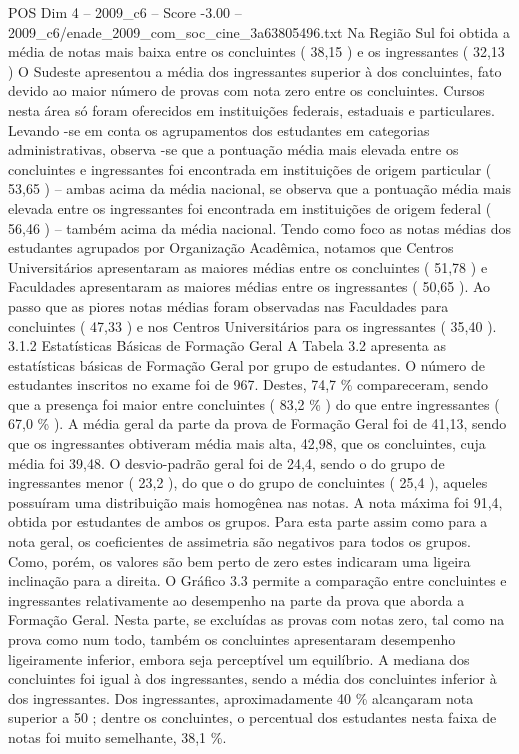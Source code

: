 \begin{textsample}{POS Dim 4 – 2009\_c6 – Score -3.00 – 2009\_c6/enade\_2009\_com\_soc\_cine\_3a63805496.txt}
Na Região Sul foi obtida a média de notas mais baixa entre os concluintes ( 38,15 ) e os ingressantes ( 32,13 ) O Sudeste apresentou a média dos ingressantes superior à dos concluintes, fato devido ao maior número de provas com nota zero entre os concluintes.
Cursos nesta área só foram oferecidos em instituições federais, estaduais e particulares.
Levando -se em conta os agrupamentos dos estudantes em categorias administrativas, observa -se que a pontuação média mais elevada entre os concluintes e ingressantes foi encontrada em instituições de origem particular ( 53,65 ) – ambas acima da média nacional, se observa que a pontuação média mais elevada entre os ingressantes foi encontrada em instituições de origem federal ( 56,46 ) – também acima da média nacional.
Tendo como foco as notas médias dos estudantes agrupados por Organização Acadêmica, notamos que Centros Universitários apresentaram as maiores médias entre os concluintes ( 51,78 ) e Faculdades apresentaram as maiores médias entre os ingressantes ( 50,65 ).
Ao passo que as piores notas médias foram observadas nas Faculdades para concluintes ( 47,33 ) e nos Centros Universitários para os ingressantes ( 35,40 ). 3.1.2 Estatísticas Básicas de Formação Geral A Tabela 3.2 apresenta as estatísticas básicas de Formação Geral por grupo de estudantes.
O número de estudantes inscritos no exame foi de 967.
Destes, 74,7 \% compareceram, sendo que a presença foi maior entre concluintes ( 83,2 \% ) do que entre ingressantes ( 67,0 \% ).
A média geral da parte da prova de Formação Geral foi de 41,13, sendo que os ingressantes obtiveram média mais alta, 42,98, que os concluintes, cuja média foi 39,48.
O desvio-padrão geral foi de 24,4, sendo o do grupo de ingressantes menor ( 23,2 ), do que o do grupo de concluintes ( 25,4 ), aqueles possuíram uma distribuição mais homogênea nas notas.
A nota máxima foi 91,4, obtida por estudantes de ambos os grupos.
Para esta parte assim como para a nota geral, os coeficientes de assimetria são negativos para todos os grupos.
Como, porém, os valores são bem perto de zero estes indicaram uma ligeira inclinação para a direita.
O Gráfico 3.3 permite a comparação entre concluintes e ingressantes relativamente ao desempenho na parte da prova que aborda a Formação Geral.
Nesta parte, se excluídas as provas com notas zero, tal como na prova como num todo, também os concluintes apresentaram desempenho ligeiramente inferior, embora seja perceptível um equilíbrio.
A mediana dos concluintes foi igual à dos ingressantes, sendo a média dos concluintes inferior à dos ingressantes.
Dos ingressantes, aproximadamente 40 \% alcançaram nota superior a 50 ; dentre os concluintes, o percentual dos estudantes nesta faixa de notas foi muito semelhante, 38,1 \%.

\end{textsample}
